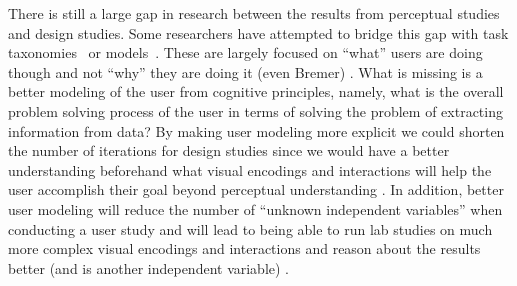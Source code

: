 There is still a large gap in research between the results from perceptual
studies and design studies. Some researchers have attempted to bridge this gap
with task taxonomies~ or 
models~. These are largely focused on 
``what'' users are doing though and not
``why'' they are doing it (even Bremer) 
. What is
missing is a better modeling of the user from cognitive principles, namely,
what is the overall problem solving process of the user in terms of solving the
problem of extracting information from data? By making user modeling more
explicit we could shorten the number of iterations for design studies since we
would have a better understanding beforehand what visual encodings and
interactions will help the user accomplish their goal beyond perceptual
understanding . In addition, better user modeling will reduce the number of
``unknown independent variables'' when conducting a user study and will lead to
being able to run lab studies on much more complex visual encodings and
interactions and reason about the results better (and is another independent
variable) .


